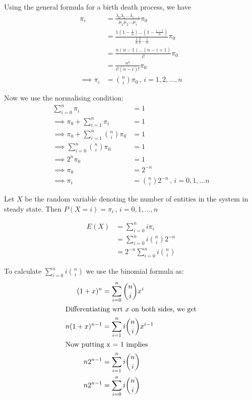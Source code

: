 \documentclass[12pt, oneside]{article}
\begin{document}
\begin{enumerate}
{    Using the general formula for a birth death process, we have
    \begin{align*}
        \pi_i &= \frac{\lambda_0 \lambda_1 \ldots \lambda_{i-1}}{\mu_1 \mu_2 \ldots \mu_i} \pi_0 \\
              &= \frac{1(1 - \frac{1}{n})\ldots(1 - \frac{i - 1}{n})}{\frac{1}{n}\frac{2}{n}\ldots\frac{i}{n}} \pi_0 \\
              &= \frac{n(n-1)\ldots(n - i + 1)}{i!} \pi_0\\
              &= \frac{n!}{i! (n - i)!} \pi_0 \\
        \implies \pi_i &= {n \choose i} \pi_0 \,,\,i = 1, 2, \ldots, n
    \end{align*}

    Now we use the normalising condition:
    \begin{align*}
        \sum_{i = 0}^{n} \pi_i &= 1 \\
        \implies \pi_0 + \sum_{i = 1}^{n} \pi_i &= 1 \\
        \implies \pi_0 + \sum_{i = 1}^{n} {n \choose i} \pi_0 &= 1 \\
        \implies \sum_{i = 0}^{n} {n \choose i} \pi_0 &= 1 \\
        \implies 2^n \pi_0 &= 1 \\
        \implies \pi_0 &= 2^{-n} \\
        \implies \pi_i &= {n \choose i} 2^{-n} \,,\, i = 0, 1, \ldots n
    \end{align*}

    Let \(X\) be the random variable denoting the number of entities in the system in
    steady state. Then \(P(X = i) = \pi_i \,,\, i = 0, 1, \ldots, n\)

    \begin{align*}
        E(X) &= \sum_{i = 0}^n i \pi_i \\
             &= \sum_{i = 0}^n i {n \choose i} 2^{-n} \\
             &=  2^{-n} \sum_{i = 0}^n i {n \choose i}
    \end{align*}

    To calculate \(\sum_{i = 0}^n i {n \choose i}\) we use the binomial formula as:
    \begin{align*}
        (1 + x)^n &= \sum_{i = 0}^{n} {n \choose i} x^i \\
        \intertext{Differentiating wrt \(x\) on both sides, we get}
        n (1 + x)^{n - 1} &= \sum_{i = 1}^{n} i {n \choose i} x^{i - 1} \\
        \intertext{Now putting x = 1 implies}
        n 2^{n-1} &= \sum_{i = 1}^n i {n \choose i} \\
        n 2^{n-1} &= \sum_{i = 0}^n i {n \choose i}
    \end{align*}

}
\end{enumerate}
\end{document}
